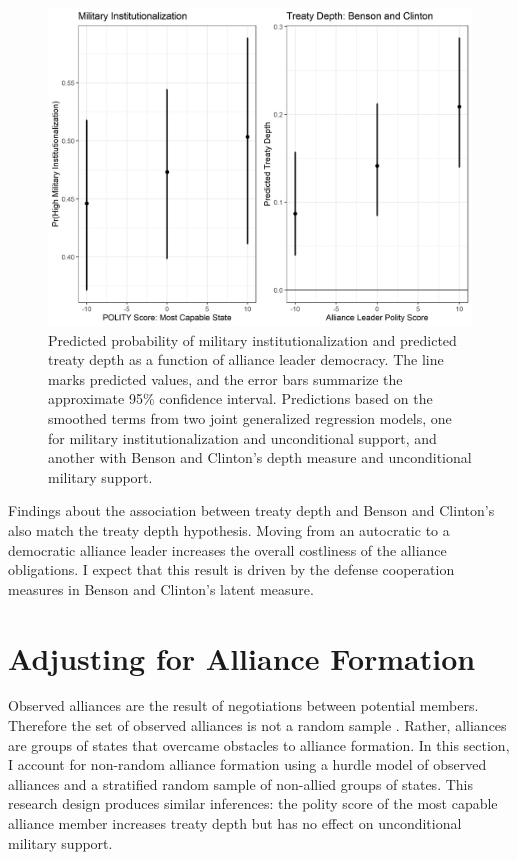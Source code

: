 \documentclass[12pt]{article}
\begin{document}
\begin{figure}
\includegraphics[width=.95\textwidth]{results-alt-measures.png}  
\caption{Predicted probability of military institutionalization and predicted treaty depth as a function of alliance leader democracy. The line marks predicted values, and the error bars summarize the approximate 95\% confidence interval. Predictions based on the smoothed terms from two joint generalized regression models, one for military institutionalization and unconditional support, and another with Benson and Clinton's depth measure and unconditional military support. }
\label{fig:results-alt-measures}
\end{figure}

Findings about the association between treaty depth and Benson and Clinton's also match the treaty depth hypothesis. 
Moving from an autocratic to a democratic alliance leader increases the overall costliness of the alliance obligations. 
I expect that this result is driven by the defense cooperation measures in Benson and Clinton's latent measure. 



\section{Adjusting for Alliance Formation}


Observed alliances are the result of negotiations between potential members. 
Therefore the set of observed alliances is not a random sample \citep{Poast2019a}.
Rather, alliances are groups of states that overcame obstacles to alliance formation.  
In this section, I account for non-random alliance formation using a hurdle model of observed alliances and a stratified random sample of non-allied groups of states. 
This research design produces similar inferences: the polity score of the most capable alliance member increases treaty depth but has no effect on unconditional military support. 
\end{document}
